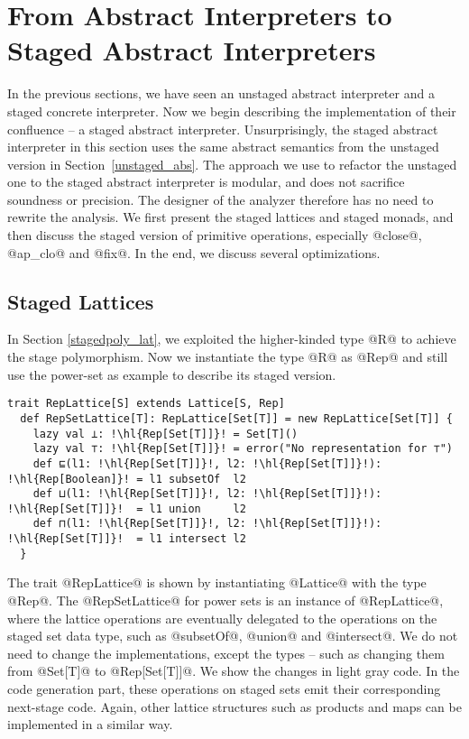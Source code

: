 \section{From Abstract Interpreters to Staged Abstract Interpreters} \label{sai}

In the previous sections, we have seen an unstaged abstract interpreter and a
staged concrete interpreter. Now we begin describing the implementation of
their confluence -- a staged abstract interpreter.  Unsurprisingly, the staged
abstract interpreter in this section uses the same abstract semantics from the
unstaged version in Section~\ref{unstaged_abs}.  The approach we use to refactor
the unstaged one to the staged abstract interpreter is modular, and does not
sacrifice soundness or precision. The designer of the analyzer therefore has no
need to rewrite the analysis. We first present the staged lattices and staged
monads, and then discuss the staged version of primitive operations, especially
@close@, @ap_clo@ and @fix@. In the end, we discuss several optimizations.

\subsection{Staged Lattices}

In Section \ref{stagedpoly_lat}, we exploited the higher-kinded type @R@ to
achieve the stage polymorphism. Now we instantiate the type @R@ as @Rep@ and
still use the power-set as example to describe its staged version.
\begin{lstlisting}[escapechar=!]
  trait RepLattice[S] extends Lattice[S, Rep]
  def RepSetLattice[T]: RepLattice[Set[T]] = new RepLattice[Set[T]] {
    lazy val ⊥: !\hl{Rep[Set[T]]}! = Set[T]()
    lazy val ⊤: !\hl{Rep[Set[T]]}! = error("No representation for ⊤")
    def ⊑(l1: !\hl{Rep[Set[T]]}!, l2: !\hl{Rep[Set[T]]}!): !\hl{Rep[Boolean]}! = l1 subsetOf  l2
    def ⊔(l1: !\hl{Rep[Set[T]]}!, l2: !\hl{Rep[Set[T]]}!): !\hl{Rep[Set[T]]}!  = l1 union     l2
    def ⊓(l1: !\hl{Rep[Set[T]]}!, l2: !\hl{Rep[Set[T]]}!): !\hl{Rep[Set[T]]}!  = l1 intersect l2
  }
\end{lstlisting}

The trait @RepLattice@ is shown by instantiating @Lattice@ with the type @Rep@.
The @RepSetLattice@ for power sets is an instance of @RepLattice@, where the
lattice operations are eventually delegated to the operations on the staged set
data type, such as @subsetOf@, @union@ and @intersect@. We do not need to
change the implementations, except the types -- such as changing them from
@Set[T]@ to @Rep[Set[T]]@.  We show the changes in light gray code. 
In the code generation part, these operations on staged sets emit their
corresponding next-stage code. Again, other lattice structures such as products
and maps can be implemented in a similar way.

